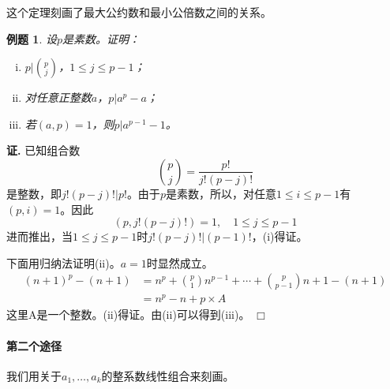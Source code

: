 \documentclass{ctexrep}
\newtheorem{exmp}{例题}[section]
\renewenvironment{proof}[1][证]{\noindent \textbf{#1.} }{\hfill$\Box$}
\begin{document}
这个定理刻画了最大公约数和最小公倍数之间的关系。

\begin{exmp}
设$p$是素数。证明：
\begin{enumerate}[(i)]
\item $p|\binom{p}{j}$，$1\leq j\leq p-1$；
\item 对任意正整数$a$，$p|a^p-a$；
\item 若$(a,p)=1$，则$p|a^{p-1}-1$。
\end{enumerate}
\end{exmp}
\begin{proof}
已知组合数
\begin{displaymath}
\binom{p}{j}=\frac{p!}{j!(p-j)!}
\end{displaymath}
是整数，即$j!(p-j)!|p!$。由于$p$是素数，所以，对任意$1\leq i\leq p-1$有$(p,i)=1$。因此
\begin{displaymath}
(p,j!(p-j)!)=1,\quad 1\leq j\leq p-1
\end{displaymath}
进而推出，当$1\leq j\leq p-1$时$j!(p-j)!|(p-1)!$，(i)得证。

下面用归纳法证明(ii)。$a=1$时显然成立。
\begin{align}
(n+1)^p-(n+1)&=n^p+\binom{p}{1}n^{p-1}+\dotsb+\binom{p}{p-1}n+1-(n+1)\nonumber \\
             &=n^p-n+p \times A  \nonumber
\end{align}
这里A是一个整数。(ii)得证。由(ii)可以得到(iii)。
\end{proof}

\paragraph{第二个途径}
我们用关于$a_1,\dotsc,a_k$的整系数线性组合来刻画。
\end{document}
